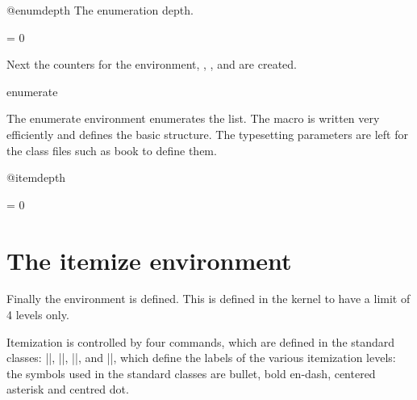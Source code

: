 \begin{texcode}{}{}
 \begin{docCommand}{@enumdepth}{}
  The enumeration depth. 
 \end{docCommand}
     \begin{teX}
\newcount\@enumdepth \@enumdepth = 0
    \end{teX}
 

Next the counters for the  environment, , ,  and  are created.

    \begin{teX}
   
    \end{teX}


 \begin{docEnvironment}{enumerate}{}{}
 \end{docEnvironment}  
   The enumerate environment enumerates the list. The macro
  is written very efficiently and defines the basic structure. The
  typesetting parameters are left for the class files such as book
  to define them.

     \begin{teX}
\def\enumerate{%
  \ifnum \@enumdepth >\thr@@\@toodeep\else
    \advance\@enumdepth\@ne
    \edef\@enumctr{enum\romannumeral\the\@enumdepth}%
      \expandafter
      \list
         \csname label\@enumctr\endcsname
        {\usecounter\@enumctr\def\makelabel##1{\hss\llap{##1}}}%
  \fi}
    \end{teX}

    \begin{teX}
\let\endenumerate =\endlist
    \end{teX}

 \begin{docCommand}{@itemdepth}{}
 \end{docCommand}
    \begin{teX}
\newcount\@itemdepth \@itemdepth = 0
    \end{teX}

\section{The itemize environment}

Finally the  environment is defined. This is defined in the kernel to have a limit of 4 levels only.

Itemization is controlled by four commands, which are defined in the standard classes: ||,
   ||, ||, and ||, which define
    the labels of the various itemization levels: the symbols used in the standard classes are
    bullet, bold en-dash, centered asterisk and centred dot.




\end{texcode}
